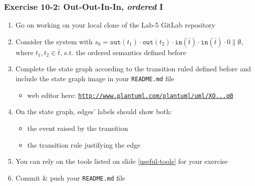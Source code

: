 \documentclass[presentation]{beamer}\mode<presentation>{\usetheme{AMSCesenaPurpleAndGold}}
\begin{document}
\begin{frame}
\frametitle{Exercise 10-2: Out-Out-In-In, \emph{ordered} I}
    \begin{enumerate}
        \item Go on working on your local clone of the Lab-5 GitLab repository
        
        \vfill
        
        \item Consider the system with \alert{$s_0 = \mathtt{out}(t_1) \cdot \mathtt{out}(t_2) \cdot \mathtt{in}(\bar t) \cdot \mathtt{in}(\bar t) \cdot 0  \parallel \emptyset$}, where $t_1, t_2 \in \bar{t}$, s.t. the \alert{ordered} \linda{} semantics defined before
        
        \vfill
    
        \item Complete the state graph according to the transition ruled defined before and include the state graph image in your \alert{\texttt{README.md}} file
        \begin{itemize}
            \item web editor here: \href{
                http://www.plantuml.com/plantuml/uml/XO_1IiD048RlynHpR8MMjCTIacBLenvgJxM79JlMePlTi3khHl5WKV15V1kVeazYQeH627XOzeV__pwOMH3b9HO6mfPjgRmgy8nkLJHouQmi-8bmdBJAXIYXdqegGyYY3EUXcxvK1U7SHS_auOur8HMbLAWfv9vBOMUXHOQ36fy1yLJbsurtqUgvCyvFf-TMizsaAJh3zzIrM5fwBEj4kbvLP8nxW1U0rSaQ1uCKGmADFYGJT55wij-zzeU_QTSVikt9rzlnJt3_yLc_TmX9OnYrm1kxkbfUrsaDZRUf_x4TK0YZHZS-xhjqO_nxqmIpB8CPMHqBymq0
            }{\texttt{http://www.plantuml.com/plantuml/uml/XO...q0}}
        \end{itemize}
        
        \vfill
        
        \item On the state graph, edges' labels should show both:
        \begin{itemize}
            \item the event raised by the transition
            \item the transition rule justifying the edge
        \end{itemize}
        
        \vfill
        
        \item You can rely on the tools listed on slide \ref{useful-tools} for your exercise
        
        \vfill
        
        \item Commit \& push your \texttt{README.md} file
        
    \end{enumerate}
    
\end{frame}
\end{document}
